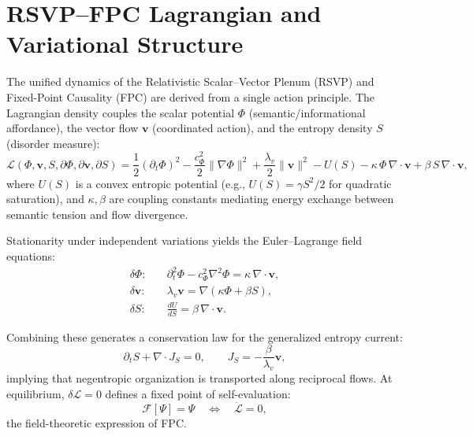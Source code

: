 \documentclass[12pt,a4paper]{article}
\begin{document}
\section{RSVP--FPC Lagrangian and Variational Structure}
The unified dynamics of the Relativistic Scalar--Vector Plenum (RSVP) and Fixed-Point Causality (FPC) are derived from a single action principle. The Lagrangian density couples the scalar potential $\Phi$ (semantic/informational affordance), the vector flow $\bm{v}$ (coordinated action), and the entropy density $S$ (disorder measure):
\begin{equation}
\mathcal{L}(\Phi,\bm{v},S,\partial\Phi,\partial\bm{v},\partial S)
= \frac{1}{2} (\partial_t \Phi)^2
- \frac{c_\Phi^2}{2} \|\nabla \Phi\|^2
+ \frac{\lambda_v}{2} \|\bm{v}\|^2
- U(S)
- \kappa \, \Phi \, \nabla\!\cdot\!\bm{v}
+ \beta \, S \, \nabla\!\cdot\!\bm{v},
\label{eq:lagrangian}
\end{equation}
where $U(S)$ is a convex entropic potential (e.g., $U(S) = \gamma S^2 / 2$ for quadratic saturation), and $\kappa, \beta$ are coupling constants mediating energy exchange between semantic tension and flow divergence.

Stationarity under independent variations yields the Euler--Lagrange field equations:
\begin{align}
\delta \Phi: \quad
&\partial_t^2 \Phi - c_\Phi^2 \nabla^2 \Phi = \kappa \, \nabla\!\cdot\!\bm{v}, \label{eq:phi-el} \\[4pt]
\delta \bm{v}: \quad
&\lambda_v \bm{v} = \nabla (\kappa \Phi + \beta S), \label{eq:v-el} \\[4pt]
\delta S: \quad
&\frac{dU}{dS} = \beta \, \nabla\!\cdot\!\bm{v}. \label{eq:s-el}
\end{align}

Combining these generates a conservation law for the generalized entropy current:
\begin{equation}
\partial_t S + \nabla\!\cdot\! J_S = 0,
\qquad
J_S = -\frac{\beta}{\lambda_v} \bm{v},
\label{eq:entropy-current}
\end{equation}
implying that negentropic organization is transported along reciprocal flows. At equilibrium, $\delta \mathcal{L} = 0$ defines a fixed point of self-evaluation:
\begin{equation}
\mathcal{F}[\Psi] = \Psi \quad \Leftrightarrow \quad \dot{\mathcal{L}} = 0,
\label{eq:fpc}
\end{equation}
the field-theoretic expression of FPC.
\end{document}
